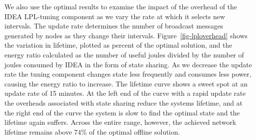 We also use the optimal results to examine the impact of the overhead of the
IDEA LPL-tuning component as we vary the rate at which it selects new
intervals. The update rate determines the number of broadcast messages
generated by nodes as they change their intervals.
Figure~\ref{fig-lploverhead} shows the variation in lifetime, plotted as
percent of the optimal solution, and the energy ratio calculated as the
number of useful joules divided by the number of joules consumed by IDEA in
the form of state sharing. As we decrease the update rate the tuning
component changes state less frequently and consumes less power, causing the
energy ratio to increase. The lifetime curve shows a sweet spot at an update
rate of 15 minutes. At the left end of the curve with a rapid update rate the
overheads associated with state sharing reduce the systems lifetime, and at
the right end of the curve the system is slow to find the optimal state and
the lifetime again suffers.  Across the entire range, however, the achieved
network lifetime remains above 74\% of the optimal offline solution.




